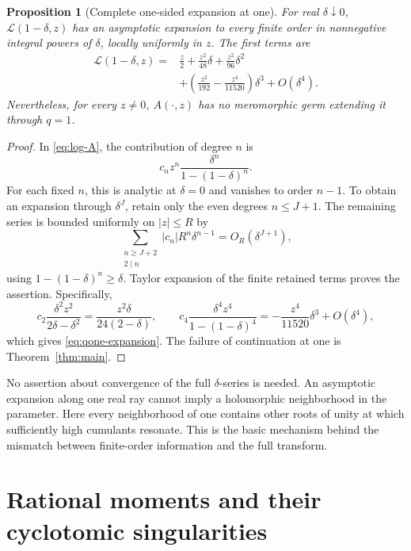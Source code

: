 \documentclass[11pt,a4paper]{article}
\numberwithin{equation}{section}
\newtheorem{proposition}[theorem]{Proposition}
\theoremstyle{definition}
\theoremstyle{remark}
\newcommand{\LL}{\mathcal L}
\begin{document}
\begin{proposition}[Complete one-sided expansion at one]\label{prop:qone-all}
For real \(\delta\downarrow0\), \(\LL(1-\delta,z)\) has an asymptotic expansion to every finite order in nonnegative integral powers of \(\delta\), locally uniformly in \(z\). The first terms are
\begin{equation}\label{eq:qone-expansion}
\begin{split}
 \LL(1-\delta,z)={}&\frac z2+\frac{z^2}{48}\delta
       +\frac{z^2}{96}\delta^2\\
 &+\left(\frac{z^2}{192}-\frac{z^4}{11520}\right)\delta^3
       +O(\delta^4).
\end{split}
\end{equation}
Nevertheless, for every \(z\ne0\), \(A(\cdot,z)\) has no meromorphic germ extending it through \(q=1\).
\end{proposition}
\begin{proof}
In \eqref{eq:log-A}, the contribution of degree \(n\) is
\[
 c_nz^n\frac{\delta^n}{1-(1-\delta)^n}.
\]
For each fixed \(n\), this is analytic at \(\delta=0\) and vanishes to order \(n-1\). To obtain an expansion through \(\delta^J\), retain only the even degrees \(n\le J+1\). The remaining series is bounded uniformly on \(|z|\le R\) by
\[
 \sum_{\substack{n\ge J+2\\2\mid n}}
 |c_n|R^n\delta^{n-1}=O_R(\delta^{J+1}),
\]
using \(1-(1-\delta)^n\ge\delta\). Taylor expansion of the finite retained terms proves the assertion. Specifically,
\[
 c_2\frac{\delta^2z^2}{2\delta-\delta^2}
 =\frac{z^2\delta}{24(2-\delta)},\qquad
 c_4\frac{\delta^4z^4}{1-(1-\delta)^4}
 =-\frac{z^4}{11520}\delta^3+O(\delta^4),
\]
which gives \eqref{eq:qone-expansion}. The failure of continuation at one is Theorem~\ref{thm:main}.
\end{proof}

No assertion about convergence of the full \(\delta\)-series is needed. An asymptotic expansion along one real ray cannot imply a holomorphic neighborhood in the parameter. Here every neighborhood of one contains other roots of unity at which sufficiently high cumulants resonate. This is the basic mechanism behind the mismatch between finite-order information and the full transform.

\section{Rational moments and their cyclotomic singularities}
\end{document}
